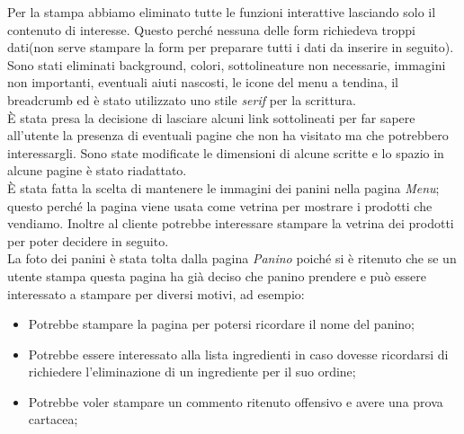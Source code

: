 Per la stampa abbiamo eliminato tutte le funzioni interattive lasciando solo il contenuto di interesse.
Questo perché nessuna delle form richiedeva troppi dati(non serve stampare la form per preparare tutti i dati da inserire in seguito).\\
Sono stati eliminati background, colori, sottolineature non necessarie, immagini non importanti, eventuali aiuti nascosti, le icone del menu a tendina, il breadcrumb ed è stato utilizzato uno stile \emph{serif} per la scrittura.\\
È stata presa la decisione di lasciare alcuni link sottolineati per far sapere all'utente la presenza di eventuali pagine che non ha visitato ma che potrebbero interessargli. %
Sono state modificate le dimensioni di alcune scritte e lo spazio in alcune pagine è stato riadattato.\\
È stata fatta la scelta di mantenere le immagini dei panini nella pagina \emph{Menu}; 
questo perché la pagina viene usata come vetrina per mostrare i prodotti che vendiamo.
Inoltre al cliente potrebbe interessare stampare la vetrina dei prodotti per poter decidere in seguito.\\
La foto dei panini è stata tolta dalla pagina \emph{Panino} poiché si è ritenuto che se un utente stampa questa pagina ha già deciso che panino prendere e può essere interessato a stampare per diversi motivi, ad esempio:
\begin{itemize}
	\item Potrebbe stampare la pagina per potersi ricordare il nome del panino;
	\item Potrebbe essere interessato alla lista ingredienti in caso dovesse ricordarsi di richiedere l'eliminazione di un ingrediente per il suo ordine;
	\item Potrebbe voler stampare un commento ritenuto offensivo e avere una prova cartacea;
\end{itemize}